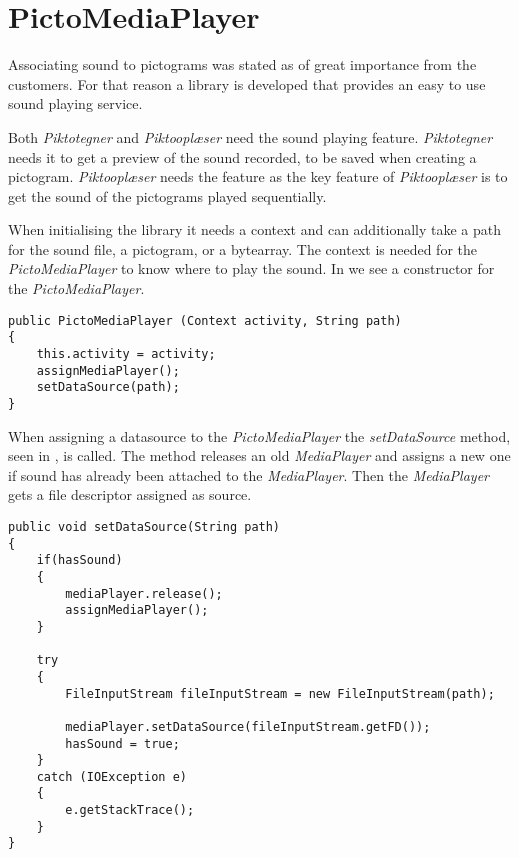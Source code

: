 \section{PictoMediaPlayer}\label{sec:pictomediaplayer}
Associating sound to pictograms was stated as of great importance from the customers.
For that reason a library is developed that provides an easy to use sound playing service.

Both \textit{Piktotegner} and \textit{Piktooplæser} need the sound playing feature. 
\textit{Piktotegner} needs it to get a preview of the sound recorded, to be saved when creating a pictogram.
\textit{Piktooplæser} needs the feature as the key feature of \textit{Piktooplæser} is to get the sound of the pictograms played sequentially. 

When initialising the library it needs a context and can additionally take a path for the sound file, a pictogram, or a bytearray. 
The context is needed for the \textit{PictoMediaPlayer} to know where to play the sound.
In  we see a constructor for the \textit{PictoMediaPlayer}.

\begin{lstlisting}[caption={Constructor for \textit{PictoMediaPlayer}.},label={lst:constructor}]
public PictoMediaPlayer (Context activity, String path)
{
    this.activity = activity;
    assignMediaPlayer();
    setDataSource(path);
}
\end{lstlisting}

When assigning a datasource to the \textit{PictoMediaPlayer} the \textit{setDataSource} method, seen in , is called. The method releases an old \textit{MediaPlayer} and assigns a new one if sound has already been attached to the \textit{MediaPlayer}.
Then the \textit{MediaPlayer} gets a file descriptor assigned as source.

\begin{lstlisting}[caption={SetDataSource method of \textit{PictoMediaPlayer}.},label={lst:setdatasource}]
public void setDataSource(String path)
{
    if(hasSound)
    {
        mediaPlayer.release();
        assignMediaPlayer();
    }

    try
    {
        FileInputStream fileInputStream = new FileInputStream(path);

        mediaPlayer.setDataSource(fileInputStream.getFD());
        hasSound = true;
    }
    catch (IOException e)
    {
        e.getStackTrace();
    }
}
\end{lstlisting}

